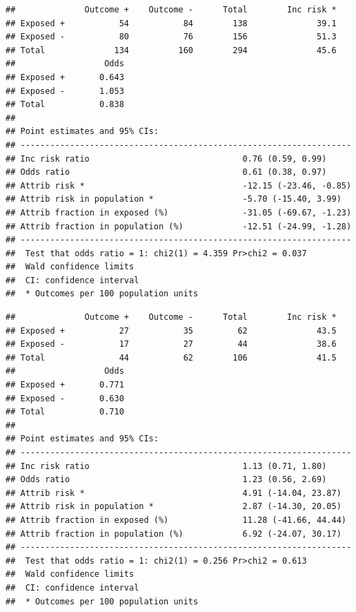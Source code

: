 \documentclass[]{book}
\newenvironment{Shaded}{\begin{snugshade}}{\end{snugshade}}
\newcommand{\CommentTok}[1]{\textcolor[rgb]{0.56,0.35,0.01}{\textit{#1}}}
\newcommand{\DataTypeTok}[1]{\textcolor[rgb]{0.13,0.29,0.53}{#1}}
\newcommand{\DecValTok}[1]{\textcolor[rgb]{0.00,0.00,0.81}{#1}}
\newcommand{\KeywordTok}[1]{\textcolor[rgb]{0.13,0.29,0.53}{\textbf{#1}}}
\newcommand{\NormalTok}[1]{#1}
\newcommand{\OperatorTok}[1]{\textcolor[rgb]{0.81,0.36,0.00}{\textbf{#1}}}
\begin{document}
\begin{verbatim}
##              Outcome +    Outcome -      Total        Inc risk *
## Exposed +           54           84        138              39.1
## Exposed -           80           76        156              51.3
## Total              134          160        294              45.6
##                  Odds
## Exposed +       0.643
## Exposed -       1.053
## Total           0.838
## 
## Point estimates and 95% CIs:
## -------------------------------------------------------------------
## Inc risk ratio                               0.76 (0.59, 0.99)
## Odds ratio                                   0.61 (0.38, 0.97)
## Attrib risk *                                -12.15 (-23.46, -0.85)
## Attrib risk in population *                  -5.70 (-15.40, 3.99)
## Attrib fraction in exposed (%)               -31.05 (-69.67, -1.23)
## Attrib fraction in population (%)            -12.51 (-24.99, -1.28)
## -------------------------------------------------------------------
##  Test that odds ratio = 1: chi2(1) = 4.359 Pr>chi2 = 0.037
##  Wald confidence limits
##  CI: confidence interval
##  * Outcomes per 100 population units
\end{verbatim}

\begin{Shaded}
\end{Shaded}

\begin{verbatim}
##              Outcome +    Outcome -      Total        Inc risk *
## Exposed +           27           35         62              43.5
## Exposed -           17           27         44              38.6
## Total               44           62        106              41.5
##                  Odds
## Exposed +       0.771
## Exposed -       0.630
## Total           0.710
## 
## Point estimates and 95% CIs:
## -------------------------------------------------------------------
## Inc risk ratio                               1.13 (0.71, 1.80)
## Odds ratio                                   1.23 (0.56, 2.69)
## Attrib risk *                                4.91 (-14.04, 23.87)
## Attrib risk in population *                  2.87 (-14.30, 20.05)
## Attrib fraction in exposed (%)               11.28 (-41.66, 44.44)
## Attrib fraction in population (%)            6.92 (-24.07, 30.17)
## -------------------------------------------------------------------
##  Test that odds ratio = 1: chi2(1) = 0.256 Pr>chi2 = 0.613
##  Wald confidence limits
##  CI: confidence interval
##  * Outcomes per 100 population units
\end{verbatim}
\end{document}
